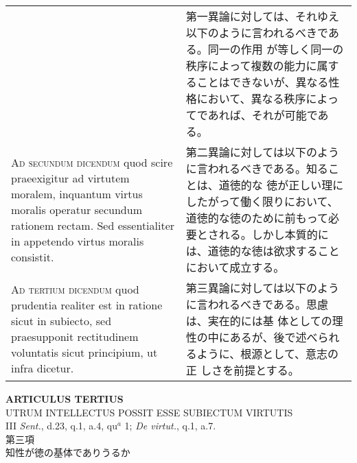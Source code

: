 \documentclass[10pt]{jsarticle}
\begin{document}
\begin{longtable}{p{21em}p{21em}}
&

第一異論に対しては、それゆえ以下のように言われるべきである。同一の作用
が等しく同一の秩序によって複数の能力に属することはできないが、異なる性
格において、異なる秩序によってであれば、それが可能である。

\\

{\scshape Ad secundum dicendum} quod scire praeexigitur ad virtutem
moralem, inquantum virtus moralis operatur secundum rationem
rectam. Sed essentialiter in appetendo virtus moralis consistit.

&

第二異論に対しては以下のように言われるべきである。知ることは、道徳的な
徳が正しい理にしたがって働く限りにおいて、道徳的な徳のために前もって必
要とされる。しかし本質的には、道徳的な徳は欲求することにおいて成立する。

\\

{\scshape Ad tertium dicendum} quod prudentia realiter est in ratione
sicut in subiecto, sed praesupponit rectitudinem voluntatis sicut
principium, ut infra dicetur.

&

第三異論に対しては以下のように言われるべきである。思慮は、実在的には基
体としての理性の中にあるが、後で述べられるように、根源として、意志の正
しさを前提とする。

\end{longtable}
\newpage

\begin{center}
{\Large {\bf ARTICULUS TERTIUS}}\\
{\large UTRUM INTELLECTUS POSSIT ESSE SUBIECTUM VIRTUTIS}\\
{\footnotesize III {\itshape Sent.}, d.23, q.1, a.4, qu$^{a}$ 1;
 {\itshape De virtut.}, q.1, a.7.}\\
{\Large 第三項\\知性が徳の基体でありうるか}
\end{center}
\end{document}
